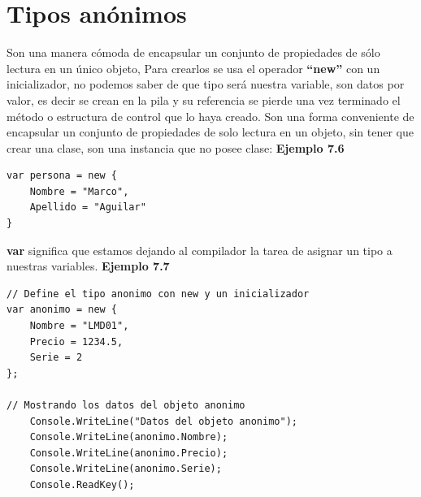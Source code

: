 \documentclass[12pt,a4paper]{report}
\begin{document}
\section{Tipos anónimos}
Son una manera cómoda de encapsular un conjunto de propiedades de sólo lectura en un único objeto, Para crearlos se usa el operador \textbf{``new”} con un inicializador, no podemos saber de que tipo será nuestra variable, son datos por valor, es decir se crean en la pila y su referencia se pierde una vez terminado el método o estructura de control que lo haya creado. Son una forma conveniente de encapsular un conjunto de propiedades de solo lectura en un objeto, sin tener que crear una clase, son una instancia que no posee clase:
\textbf{Ejemplo 7.6}
\begin{lstlisting}
var persona = new {
	Nombre = "Marco",
	Apellido = "Aguilar"
}
\end{lstlisting}\textbf{var} significa que estamos dejando al compilador la tarea de asignar un tipo a nuestras variables.
\textbf{Ejemplo 7.7}
\begin{lstlisting}
// Define el tipo anonimo con new y un inicializador
var anonimo = new {
	Nombre = "LMD01",
	Precio = 1234.5,
	Serie = 2
};

// Mostrando los datos del objeto anonimo
	Console.WriteLine("Datos del objeto anonimo");
	Console.WriteLine(anonimo.Nombre);
	Console.WriteLine(anonimo.Precio);
	Console.WriteLine(anonimo.Serie);
	Console.ReadKey();
\end{lstlisting}
\end{document}
